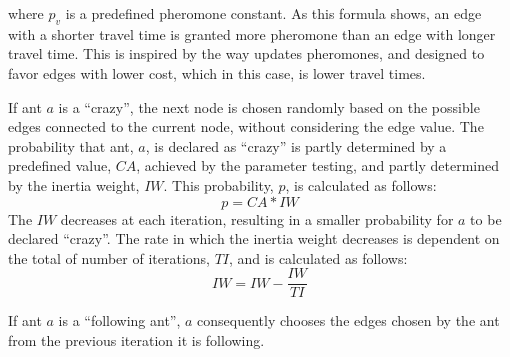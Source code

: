 where $p_v$ is a predefined pheromone constant. As this formula shows, an edge with a shorter travel time is granted more pheromone than an edge with longer travel time. This is inspired by the way \citet{hsiao04} updates pheromones, and designed to favor edges with lower cost, which in this case, is lower travel times. 

If ant $a$ is a ``crazy'', the next node is chosen randomly based on the possible edges connected to the current node, without considering the edge value. The probability that ant, $a$, is declared as ``crazy'' is partly determined by a predefined value, $CA$, achieved by the parameter testing, and partly determined by the inertia weight, $IW$. This probability, $p$, is calculated as follows:
$$p = CA*IW$$
The $IW$ decreases at each iteration, resulting in a smaller probability for $a$ to be declared ``crazy''. The rate in which the inertia weight decreases is dependent on the total of number of iterations, $TI$, and is calculated as follows:
$$IW = IW - \frac{IW}{TI}$$

If ant $a$ is a ``following ant'', $a$ consequently chooses the edges chosen by the ant from the previous iteration it is following.  